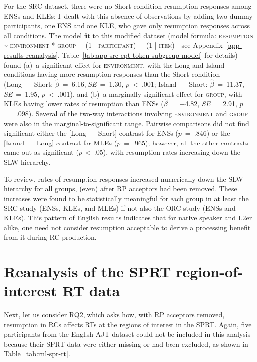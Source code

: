 For the SRC dataset, there were no Short-condition resumption responses among ENSs and KLEs; I~dealt with this absence of observations by adding two dummy participants, one ENS and one KLE, who gave only resumption responses across all conditions. The model fit to this modified dataset (model formula: \textsc{resumption \~{} environment * group + (1 | participant) + (1 | item)}---see Appendix~\ref{app-results-reanalysis}, Table~\ref{tab:app-src-ept-token-subgroup-model} for details) found (a)~a significant effect for \textsc{environment}, with the Long and Island conditions having more resumption responses than the Short condition (Long~−~Short: $\hat{\beta}$~=~6.16, \textit{SE}~=~1.30, $p$~<~.001; Island~−~Short: $\hat{\beta}$~=~11.37, \textit{SE}~=~1.95, $p$~<~.001), and (b)~a marginally significant effect for \textsc{group}, with KLEs having lower rates of resumption than ENSs ($\hat{\beta}$~=~−4.82, \textit{SE}~=~2.91, $p$~=~.098). Several of the two-way interactions involving \textsc{environment} and \textsc{group} were also in the marginal-to-significant range. Pairwise comparisons did not find significant either the [Long~−~Short] contrast for ENSs ($p$~=~.846) or the [Island~−~Long] contrast for MLEs ($p$~=~.965); however, all the other contrasts came out as significant ($p$~<~.05), with resumption rates increasing down the SLW hierarchy.

To review, rates of resumption responses increased numerically down the SLW hierarchy for all groups, (even) after RP acceptors had been removed. These increases were found to be statistically meaningful for each group in at least the SRC study (ENSs, KLEs, and MLEs) if not also the ORC study (ENSs and KLEs). This pattern of English results indicates that for native speaker and L2er alike, one need not consider resumption acceptable to derive a processing benefit from it during RC production.

\section{Reanalysis of the SPRT region-of-interest RT data}\label{rnl-spr-rt}

Next, let us consider RQ2, which asks how, with RP acceptors removed, resumption in RCs affects RTs at the regions of interest in the SPRT. Again, five participants from the English AJT dataset could not be included in this analysis because their SPRT data were either missing or had been excluded, as shown in Table~\ref{tab:rnl-spr-rt}.

